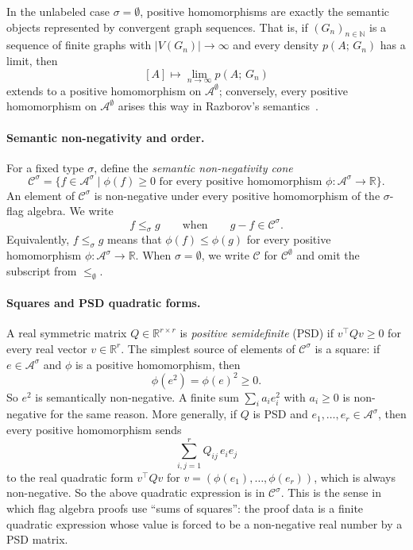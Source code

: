 \documentclass{article}
\newcommand{\den}[2]{p(#1;\,#2)}
\begin{document}
In the unlabeled case $\sigma=\emptyset$, positive homomorphisms are exactly
the semantic objects represented by convergent graph sequences.  That is, if
$(G_n)_{n \in \mathbb{N}}$ is a sequence of finite graphs with
$|V(G_n)|\to\infty$ and every density $\den{A}{G_n}$ has a limit, then
\[
  [A]\longmapsto \lim_{n\to\infty}\den{A}{G_n}
\]
extends to a positive homomorphism on $\mathcal{A}^\emptyset$; conversely,
every positive homomorphism on $\mathcal{A}^\emptyset$ arises this way in
Razborov's semantics~\cite{razborov2007flag}.

\paragraph{Semantic non-negativity and order.}
For a fixed type $\sigma$, define the \emph{semantic non-negativity cone}
\[
  \mathcal{C}^\sigma
  =
  \{f \in \mathcal{A}^\sigma
    \mid \phi(f) \geq 0
    \text{ for every positive homomorphism }
    \phi:\mathcal{A}^\sigma\to\mathbb{R}\}.
\]
An element of $\mathcal{C}^\sigma$ is non-negative under every positive
homomorphism of the $\sigma$-flag algebra.  We write
\[
  f \leq_\sigma g
  \qquad\text{when}\qquad
  g-f \in \mathcal{C}^\sigma.
\]
Equivalently, $f\leq_\sigma g$ means that
$\phi(f)\leq\phi(g)$ for every positive homomorphism
$\phi:\mathcal{A}^\sigma\to\mathbb{R}$.  When $\sigma=\emptyset$, we write
$\mathcal{C}$ for $\mathcal{C}^\emptyset$ and omit the subscript from
$\leq_\emptyset$.

\paragraph{Squares and PSD quadratic forms.}
A real symmetric matrix $Q \in \mathbb{R}^{r\times r}$ is \emph{positive
semidefinite} (PSD) if $v^\top Q v\geq 0$ for every real vector
$v \in \mathbb{R}^r$.  The simplest source of elements of
$\mathcal{C}^\sigma$ is a square: if $e\in\mathcal{A}^\sigma$ and $\phi$ is a
positive homomorphism, then
\[
  \phi(e^2)=\phi(e)^2\geq 0.
\]
So $e^2$ is semantically non-negative.  A finite sum
$\sum_i a_i e_i^2$ with $a_i\geq 0$ is non-negative for the same reason.  More
generally, if $Q$ is PSD and $e_1,\ldots,e_r\in\mathcal{A}^\sigma$, then every
positive homomorphism sends
\[
  \sum_{i,j=1}^r Q_{ij}\,e_i e_j
\]
to the real quadratic form $v^\top Q v$ for
$v=(\phi(e_1),\ldots,\phi(e_r))$, which is always non-negative.  So the
above quadratic expression is in $\mathcal{C}^\sigma$.
This is the sense in which flag algebra
proofs use ``sums of squares'': the proof data is a finite quadratic expression
whose value is forced to be a non-negative real number by a PSD matrix.
\end{document}
